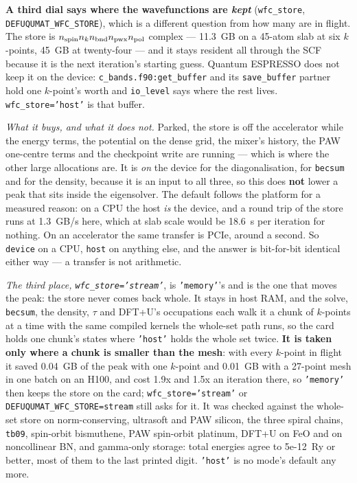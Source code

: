 \documentclass[11pt,a4paper]{article}
\newcommand{\qe}{Quantum ESPRESSO}
\newcommand{\code}[1]{\texttt{\small #1}}
\begin{document}
\textbf{A third dial says where the wavefunctions are \emph{kept}}
(\code{wfc\_store}, \code{DEFUQUMAT\_WFC\_STORE}), which is a different question
from how many are in flight. The store is $n_{\rm spin} n_k n_{\rm bnd}
n_{\rm pwx} n_{\rm pol}$ complex --- 11.3~GB on a 45-atom slab at six
$k$-points, 45~GB at twenty-four --- and it stays resident all through the SCF
because it is the next iteration's starting guess. \qe{} does not keep it on the
device: \code{c\_bands.f90:get\_buffer} and its \code{save\_buffer} partner hold
one $k$-point's worth and \code{io\_level} says where the rest lives.
\code{wfc\_store='host'} is that buffer.

\emph{What it buys, and what it does not.} Parked, the store is off the
accelerator while the energy terms, the potential on the dense grid, the mixer's
history, the PAW one-centre terms and the checkpoint write are running ---
which is where the other large allocations are. It is \emph{on} the device for
the diagonalisation, for \code{becsum} and for the density, because it is an
input to all three, so this does \textbf{not} lower a peak that sits inside the
eigensolver. The default follows the platform for a measured reason: on a CPU
the host \emph{is} the device, and a round trip of the store runs at 1.3~GB/s
here, which at slab scale would be 18.6~s per iteration for nothing. On an
accelerator the same transfer is PCIe, around a second. So \code{device} on a
CPU, \code{host} on anything else, and the answer is bit-for-bit identical
either way --- a transfer is not arithmetic.

\emph{The third place, \code{wfc\_store='stream'}}, is \code{'memory'}'s and is
the one that moves the peak: the store never comes back whole. It stays in
host RAM, and the solve, \code{becsum}, the density, $\tau$ and DFT+U's
occupations each walk it a chunk of $k$-points at a time with the same compiled
kernels the whole-set path runs, so the card holds one chunk's states where
\code{'host'} holds the whole set twice. \textbf{It is taken only where a chunk
is smaller than the mesh}: with every $k$-point in flight it saved 0.04~GB of
the peak with one $k$-point and 0.01~GB with a 27-point mesh in one batch on an
H100, and cost 1.9x and 1.5x an iteration there, so \code{'memory'} then keeps
the store on the card; \code{wfc\_store='stream'} or
\code{DEFUQUMAT\_WFC\_STORE=stream} still asks for it. It was checked against the whole-set
store on norm-conserving, ultrasoft and PAW silicon, the three spiral chains,
\code{tb09}, spin-orbit bismuthene, PAW spin-orbit platinum, DFT+U on FeO
and on noncollinear BN, and gamma-only storage: total energies agree to 5e-12~Ry or better, most of them
to the last printed digit. \code{'host'} is no mode's default any more.
\end{document}
